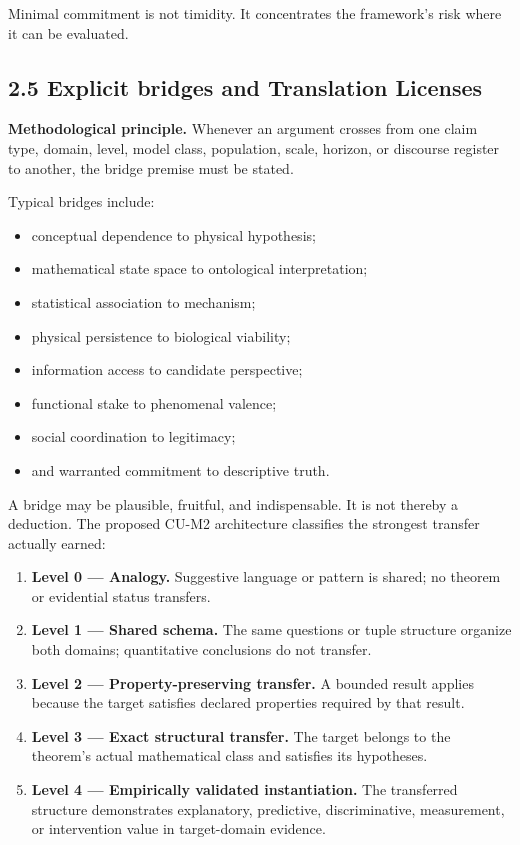 \documentclass[
  11pt,
]{article}
\providecommand{\tightlist}{%
  \setlength{\itemsep}{0pt}\setlength{\parskip}{0pt}}
\begin{document}
Minimal commitment is not timidity. It concentrates the framework's risk
where it can be evaluated.

\subsection{2.5 Explicit bridges and Translation
Licenses}\label{explicit-bridges-and-translation-licenses}

\textbf{Methodological principle.} Whenever an argument crosses from one
claim type, domain, level, model class, population, scale, horizon, or
discourse register to another, the bridge premise must be stated.

Typical bridges include:

\begin{itemize}
\tightlist
\item
  conceptual dependence to physical hypothesis;
\item
  mathematical state space to ontological interpretation;
\item
  statistical association to mechanism;
\item
  physical persistence to biological viability;
\item
  information access to candidate perspective;
\item
  functional stake to phenomenal valence;
\item
  social coordination to legitimacy;
\item
  and warranted commitment to descriptive truth.
\end{itemize}

A bridge may be plausible, fruitful, and indispensable. It is not
thereby a deduction. The proposed CU-M2 architecture classifies the
strongest transfer actually earned:

\begin{enumerate}
\def\labelenumi{\arabic{enumi}.}
\tightlist
\item
  \textbf{Level 0 --- Analogy.} Suggestive language or pattern is
  shared; no theorem or evidential status transfers.
\item
  \textbf{Level 1 --- Shared schema.} The same questions or tuple
  structure organize both domains; quantitative conclusions do not
  transfer.
\item
  \textbf{Level 2 --- Property-preserving transfer.} A bounded result
  applies because the target satisfies declared properties required by
  that result.
\item
  \textbf{Level 3 --- Exact structural transfer.} The target belongs to
  the theorem's actual mathematical class and satisfies its hypotheses.
\item
  \textbf{Level 4 --- Empirically validated instantiation.} The
  transferred structure demonstrates explanatory, predictive,
  discriminative, measurement, or intervention value in target-domain
  evidence.
\end{enumerate}
\end{document}
